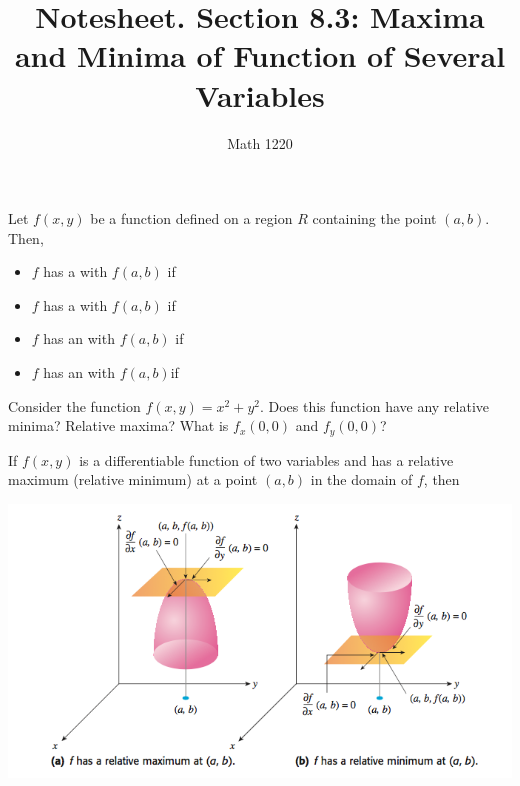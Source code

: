 \documentclass[12pt, a4paper]{article}
\author{Math 1220}
\title{Notesheet. Section 8.3: Maxima and Minima of Function of
  Several Variables}
\date{}
\begin{document}
\maketitle
\nameline
\vspace{0.5in}
\begin{defi}
  Let \(f(x,y)\) be a function defined on a region \(R\) containing
  the point \((a,b)\). Then,
  \begin{itemize}
  \item \(f\) has a  with
     \(f(a,b)\) if \\
    
  \item \(f\) has a  with
     \(f(a,b)\) if\\
    
  \item \(f\) has an  with
     \(f(a,b)\) if\\
    
  \item \(f\) has an  with
     \(f(a,b)\)if
  \end{itemize}
\end{defi}
\begin{ex}
  Consider the function \(f(x,y) = x^2 + y^2\). Does this function
  have any relative minima? Relative maxima? What is
  \(f_x(0,0)\) and \(f_y(0,0)\)?
\end{ex}
\begin{thrm}
  If \(f(x,y)\) is a differentiable function of two variables and has
  a relative maximum (relative minimum) at a point \((a,b)\) in the
  domain of \(f\), then 
\end{thrm}
\includegraphics[scale=0.5]{images/local-min-max}
\end{document}
